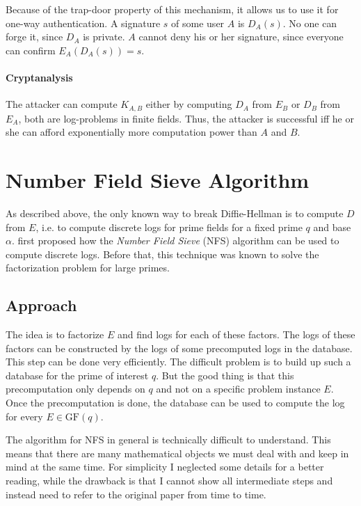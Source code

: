 \documentclass[paper=a4, fontsize=11pt]{scrartcl} %
\numberwithin{equation}{section} %
\numberwithin{figure}{section} %
\numberwithin{table}{section} %
\begin{document}
Because of the trap-door property of this mechanism, it allows us to use it for one-way authentication. A signature $s$ of some user $A$ is $D_A(s)$. No one can forge it, since $D_A$ is private. $A$ cannot deny his or her signature, since everyone can confirm $E_A(D_A(s)) = s$.

\paragraph{Cryptanalysis}
The attacker can compute $K_{A,B}$ either by computing $D_A$ from $E_B$ or $D_B$ from $E_A$, both are log-problems in finite fields. Thus, the attacker is successful iff he or she can afford exponentially more computation power than $A$ and $B$.

\section{Number Field Sieve Algorithm}
As described above, the only known way to break Diffie-Hellman is to compute $D$ from $E$, i.e. to compute discrete logs for prime fields for a fixed prime $q$ and base $\alpha$. \citep{gordon1993discrete} first proposed how the \textit{Number Field Sieve} (NFS) algorithm can be used to compute discrete logs. Before that, this technique was known to solve the factorization problem for large primes.

\subsection{Approach}
The idea is to factorize $E$ and find logs for each of these factors. The logs of these factors can be constructed by the logs of some precomputed logs in the database. This step can be done very efficiently. The difficult problem is to build up such a database for the prime of interest $q$. But the good thing is that this precomputation only depends on $q$ and not on a specific problem instance $E$. Once the precomputation is done, the database can be used to compute the log for every $E\in \mathrm{GF}(q)$.

The algorithm for NFS in general is technically difficult to understand. This means that there are many mathematical objects we must deal with and keep in mind at the same time. For simplicity I neglected some details for a better reading, while the drawback is that I cannot show all intermediate steps and instead need to refer to the original paper from time to time.
\end{document}
